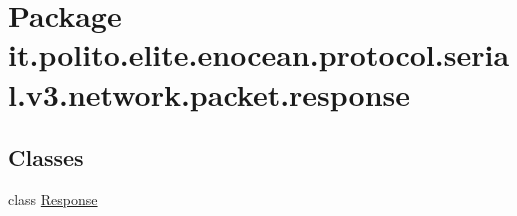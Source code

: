 \hypertarget{namespaceit_1_1polito_1_1elite_1_1enocean_1_1protocol_1_1serial_1_1v3_1_1network_1_1packet_1_1response}{}\section{Package it.\+polito.\+elite.\+enocean.\+protocol.\+serial.\+v3.\+network.\+packet.\+response}
\label{namespaceit_1_1polito_1_1elite_1_1enocean_1_1protocol_1_1serial_1_1v3_1_1network_1_1packet_1_1response}
\subsection*{Classes}
\begin{DoxyCompactItemize}
\item 
class \hyperlink{classit_1_1polito_1_1elite_1_1enocean_1_1protocol_1_1serial_1_1v3_1_1network_1_1packet_1_1response_1_1_response}{Response}
\end{DoxyCompactItemize}
